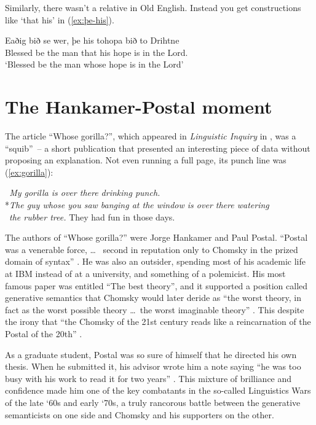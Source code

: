 Similarly, there wasn't a relative  in Old English. Instead you get constructions like  `that his' in (\ref{ex:þe-his}).

\ea \label{ex:þe-his}
    \gll Eaðig bið se wer, þe his tohopa bið to Drihtne\\
        Blessed be the man that his hope is in the Lord.\\
    \glt `Blessed be the man whose hope is in the Lord'
\z

\section{The Hankamer-Postal moment}

The article \enquote{Whose gorilla?}, which appeared in \textit{Linguistic Inquiry} in \citeyear{Hankamer1973}, was a \enquote{squib}~-- a short publication that presented an interesting piece of data without proposing an explanation. Not even running a full page, its punch line was (\ref{ex:gorilla}):

\ea \label{ex:gorilla}
 \textit{~My gorilla is over there drinking punch.} \\
 *\textit{The guy whose you saw banging at the window is over there watering}\\~\textit{the rubber tree.}
\z
They had fun in those days.

The authors of \enquote{Whose gorilla?} were Jorge Hankamer and Paul Postal. \enquote{Postal was a venerable force, \dots~ second in reputation only to Chomsky in the prized domain of syntax} \citep[127--128]{Harris2021}. He was also an outsider, spending most of his academic life at IBM instead of at a university, and something of a polemicist. His most famous paper was entitled \enquote{The best theory}, and it supported a position called generative semantics that Chomsky would later deride as \enquote{the worst theory, in fact as the worst possible theory \dots~the worst imaginable theory} \citep[129]{Harris2021}. This despite the irony that \enquote{the Chomsky of the 21st century reads like a reincarnation of the Postal of the 20th} \citep[418]{Newmeyer2003}.

As a graduate student, Postal was so sure of himself that he directed his own thesis. When he submitted it, his advisor wrote him a note saying \enquote{he was too busy with his work to read it for two years} \citep{PostalInterview2020}. This mixture of brilliance and confidence made him one of the key combatants in the so-called Linguistics Wars of the late `60s and early `70s, a truly rancorous battle between the generative semanticists on one side and Chomsky and his supporters on the other.

